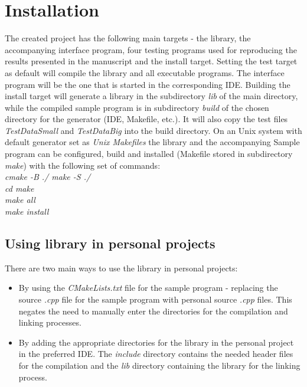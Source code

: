 	\section{Installation}
	The created project has the following main targets - the library, the accompanying interface program, four testing programs used for reproducing the results presented in the manuscript and the install target. Setting the test target as default will compile the library and all executable programs. The interface program will be the one that is started in the corresponding IDE. Building the install target will generate a library in the subdirectory \emph{lib} of the main directory, while the compiled sample program is in subdirectory \emph{build} of the chosen directory for the generator (IDE, Makefile, etc.). It will also copy the  test files \emph{TestDataSmall} and \emph{TestDataBig} into the build directory. On an Unix system with default generator set as \emph{Unix Makefiles} the library and the accompanying Sample program can be configured, build and installed (Makefile stored in subdirectory \emph{make}) with the following set of commands:\\
	\textit{cmake -B ./  make -S ./\\
	cd make\\
	make all\\
	make install}\\
	   
	   
	 \subsection{Using library in personal projects}
	There are two main ways to use the library in personal projects:
	\begin{itemize}
	\item By using the \emph{CMakeLists.txt} file for the sample program - replacing the source \emph{.cpp} file for the sample program with personal source \emph{.cpp} files. This negates the need to manually enter the directories for the compilation and linking processes. 
	\item By adding the appropriate directories for the library in the personal project in the preferred  IDE. The \emph{include} directory contains the needed header files for the compilation and the \emph{lib} directory containing the library for the linking process.
	\end{itemize}
	

